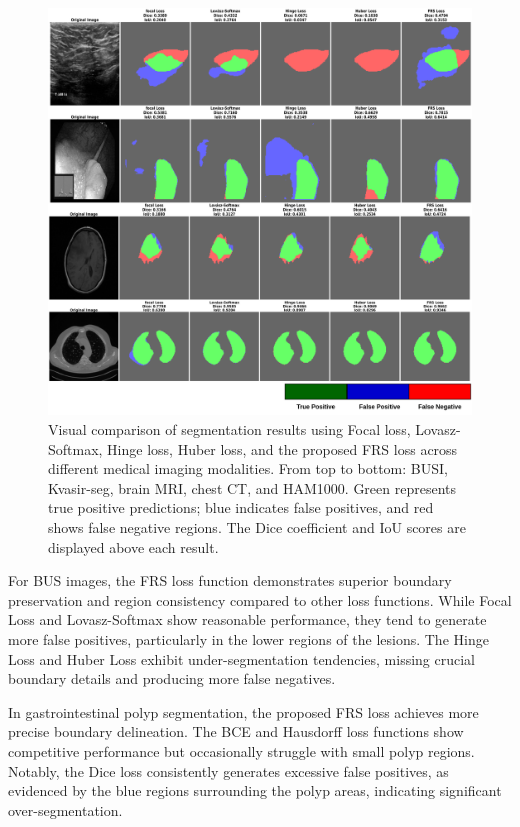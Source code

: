 \documentclass[review]{elsarticle}
\begin{document}
\begin{figure}[H]
    \centering
    \includegraphics[scale=0.5]{SampleAdvanced.png}
    \caption{Visual comparison of segmentation results using Focal loss, Lovasz-Softmax, Hinge loss, Huber loss, and the proposed FRS loss across different medical imaging modalities. From top to bottom: BUSI, Kvasir-seg, brain MRI, chest CT, and HAM1000. Green represents true positive predictions; blue indicates false positives, and red shows false negative regions. The Dice coefficient and IoU scores are displayed above each result. }
    \label{fig:sample_advanced}
\end{figure}

For BUS images, the FRS loss function demonstrates superior boundary preservation and region consistency compared to other loss functions. While Focal Loss and Lovasz-Softmax show reasonable performance, they tend to generate more false positives, particularly in the lower regions of the lesions. The Hinge Loss and Huber Loss exhibit under-segmentation tendencies, missing crucial boundary details and producing more false negatives.

In gastrointestinal polyp segmentation, the proposed FRS loss achieves more precise boundary delineation. The BCE and Hausdorff loss functions show competitive performance but occasionally struggle with small polyp regions. Notably, the Dice loss consistently generates excessive false positives, as evidenced by the blue regions surrounding the polyp areas, indicating significant over-segmentation.
\end{document}
